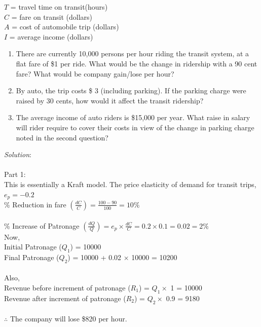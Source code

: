 \hspace*{10mm} $T$ = travel time on transit(hours)\\
\hspace*{10mm} $C$ = fare on transit (dollars)\\
\hspace*{10mm} $A$ = cost of automobile trip (dollars)\\
\hspace*{10mm} $I$ = average income (dollars)
\begin{enumerate}
	\item There are currently 10,000 persons per hour riding the transit system, at a flat fare of \$1 per ride. What would be the change in ridership with a 90 cent fare? What would be company gain/lose per hour?
	\item By auto, the trip costs \$ 3 (including parking). If the parking charge were raised by 30 cents, how would it affect the transit ridership?
	\item The average income of auto riders is \$15,000 per year. What raise in salary will rider require to cover their costs in view of the change in parking charge noted in the second question?
\end{enumerate}
\textit{Solution}:\\\\
Part 1:\\
This is essentially a Kraft model. The price elasticity of demand for transit trips,\\
$e_p = -0.2$\\
\% Reduction in fare $(\frac{dC}{C}) = \frac{100 - 90}{100} = 10\%$\\\\
\% Increase of Patronage $(\frac{dQ}{Q}) = e_p \times \frac{dC}{C} = 0.2 \times 0.1 = 0.02 = 2\%$\\
Now,\\
Initial Patronage ($Q_1$) = 10000\\
Final Patronage ($ Q_2 $) = 10000 + 0.02 $\times$ 10000 = 10200\\\\
Also,\\
Revenue before increment of patronage ($R_1$) = $Q_1 \times$ 1 = 10000\\
Revenue after increment of patronage ($R_2$) = $Q_2 \times$ 0.9 = 9180\\\\
$\therefore$ The company will lose \$820 per hour.\\\\
